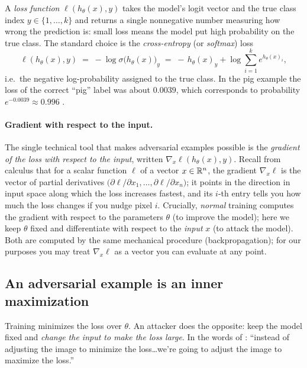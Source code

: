 \begin{definition}[Loss]
A \emph{loss function} $\ell(h_\theta(x),y)$ takes the model's logit vector and the true class index $y\in\{1,\dots,k\}$ and returns a single nonnegative number measuring how wrong the prediction is: small loss means the model put high probability on the true class. The standard choice is the \emph{cross-entropy} (or \emph{softmax}) loss
\[
  \ell(h_\theta(x),y) \;=\; -\log \sigma\!\big(h_\theta(x)\big)_y
  \;=\; -\,h_\theta(x)_y + \log\!\sum_{i=1}^k e^{h_\theta(x)_i},
\]
i.e.\ the negative log-probability assigned to the true class. In the pig example the loss of the correct ``pig'' label was about $0.0039$, which corresponds to probability $e^{-0.0039}\approx 0.996$ \citep{kolter2018adversarial}.
\end{definition}

\paragraph{Gradient with respect to the input.} The single technical tool that makes adversarial examples possible is the \emph{gradient of the loss with respect to the input}, written $\nabla_x \ell(h_\theta(x),y)$. Recall from calculus that for a scalar function $\ell$ of a vector $x\in\mathbb{R}^n$, the gradient $\nabla_x \ell$ is the vector of partial derivatives $\big(\partial \ell/\partial x_1,\dots,\partial \ell/\partial x_n\big)$; it points in the direction in input space along which the loss increases fastest, and its $i$-th entry tells you how much the loss changes if you nudge pixel $i$. Crucially, \emph{normal} training computes the gradient with respect to the parameters $\theta$ (to improve the model); here we keep $\theta$ fixed and differentiate with respect to the \emph{input} $x$ (to attack the model). Both are computed by the same mechanical procedure (backpropagation); for our purposes you may treat $\nabla_x \ell$ as a vector you can evaluate at any point.

\subsection{An adversarial example is an inner maximization}
\label{sub:inner-max}

Training minimizes the loss over $\theta$. An attacker does the opposite: keep the model fixed and \emph{change the input to make the loss large}. In the words of \citet{kolter2018adversarial}: ``instead of adjusting the image to minimize the loss\dots we're going to adjust the image to maximize the loss.''


